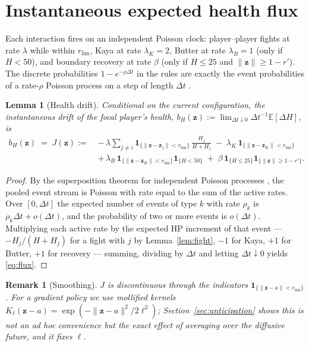 \documentclass[11pt]{article}
\newtheorem{lemma}[theorem]{Lemma}
\newtheorem*{remark}{Remark}
\newcommand{\E}{\mathbb{E}}
\newcommand{\rlim}{r_{\mathrm{lim}}}
\newcommand{\z}{\mathbf{z}}
\begin{document}
\newpage
\section{Instantaneous expected health flux}\label{sec:flux}

Each interaction fires on an independent Poisson clock: player--player fights at
rate $\lambda$ while within $\rlim$, Kaya at rate $\lambda_K=2$, Butter at rate
$\lambda_B=1$ (only if $H<50$), and boundary recovery at rate $\beta$ (only if
$H\le 25$ and $\|\z\|\ge 1-r'$). The discrete probabilities $1-e^{-\rho\Delta t}$
in the rules are exactly the event probabilities of a rate-$\rho$ Poisson process
on a step of length $\Delta t$ \cite{Kingman}.

\begin{lemma}[Health drift]\label{lem:flux}
Conditional on the current configuration, the instantaneous drift of the focal
player's health, $b_H(\z):=\lim_{\Delta t\downarrow0}\Delta t^{-1}\E[\Delta H]$, is
\begin{equation}\label{eq:flux}
\begin{aligned}
  b_H(\z) \;=\; J(\z) :=\;
  &-\,\lambda \sum_{j\ne i} \mathbf 1_{\{\|\z-\z_j\|<\rlim\}}\,\frac{H_j}{H+H_j}
   \;-\; \lambda_K\,\mathbf 1_{\{\|\z-\z_K\|<\rlim\}} \\
  &+\,\lambda_B\,\mathbf 1_{\{\|\z-\z_B\|<\rlim\}}\mathbf 1_{\{H<50\}}
   \;+\; \beta\,\mathbf 1_{\{H\le 25\}}\mathbf 1_{\{\|\z\|\ge 1-r'\}} .
\end{aligned}
\end{equation}
\end{lemma}

\begin{proof}
By the superposition theorem for independent Poisson processes \cite{Kingman},
the pooled event stream is Poisson with rate equal to the sum of the active
rates. Over $[0,\Delta t]$ the expected number of events of type $k$ with rate
$\rho_k$ is $\rho_k\Delta t+o(\Delta t)$, and the probability of two or more
events is $o(\Delta t)$. Multiplying each active rate by the expected HP
increment of that event --- $-H_j/(H+H_j)$ for a fight with $j$ by
Lemma~\ref{lem:fight}, $-1$ for Kaya, $+1$ for Butter, $+1$ for recovery ---
summing, dividing by $\Delta t$ and letting $\Delta t\downarrow0$ yields
\eqref{eq:flux}.
\end{proof}

\begin{remark}[Smoothing]
$J$ is discontinuous through the indicators $\mathbf 1_{\{\|\z-a\|<\rlim\}}$. For
a gradient policy we use mollified kernels $K_\ell(\z-a)=\exp(-\|\z-a\|^2/2\ell^2)$;
Section~\ref{sec:anticipation} shows this is not an ad hoc convenience but the
exact effect of averaging over the diffusive future, and it fixes $\ell$.
\end{remark}
\end{document}
